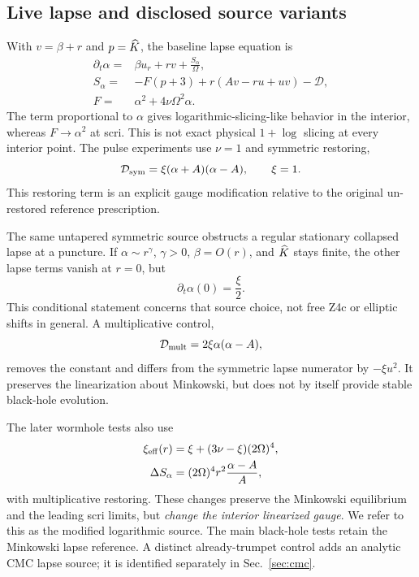 \subsection{Live lapse and disclosed source variants}
With $v=\beta+r$ and $p=\widehat K$, the baseline lapse equation is
\begin{align}
 \partial_t\alpha={}&\beta u_r+rv+\frac{S_\alpha}{\Omega},\nonumber\\
 S_\alpha={}&-F(p+3)+r(Av-ru+uv)-\mathcal D,\label{eq:lapse}\\
 F={}&\alpha^2+4\nu\Omega^2\alpha.\nonumber
\end{align}
The term proportional to $\alpha$ gives logarithmic-slicing-like behavior in the interior, whereas $F\to\alpha^2$ at scri. This is not exact physical $1+\log$ slicing at every interior point. The pulse experiments use $\nu=1$ and symmetric restoring,
\begin{equation}
 \mathcal D_{\rm sym}=\xi(\alpha+A)(\alpha-A),\qquad\xi=1.
\end{equation}
This restoring term is an explicit gauge modification relative to the original un-restored reference prescription.

The same untapered symmetric source obstructs a regular stationary collapsed lapse at a puncture. If $\alpha\sim r^\gamma$, $\gamma>0$, $\beta=O(r)$, and $\widehat K$ stays finite, the other lapse terms vanish at $r=0$, but
\begin{equation}
 \partial_t\alpha(0)=\frac{\xi}{2}.
\label{eq:obstruction}
\end{equation}
This conditional statement concerns that source choice, not free Z4c or elliptic shifts in general. A multiplicative control,
\begin{equation}
 \mathcal D_{\rm mult}=2\xi\alpha(\alpha-A),
\end{equation}
removes the constant and differs from the symmetric lapse numerator by $-\xi u^2$. It preserves the linearization about Minkowski, but does not by itself provide stable black-hole evolution.

The later wormhole tests also use
\begin{align}
 \xi_{\rm eff}(r)&=\xi+(3\nu-\xi)(2\Omega)^4,\nonumber\\
 \Delta S_\alpha&=(2\Omega)^4r^2\frac{\alpha-A}{A},
\label{eq:physical-log}
\end{align}
with multiplicative restoring. These changes preserve the Minkowski equilibrium and the leading scri limits, but \emph{change the interior linearized gauge}. We refer to this as the modified logarithmic source. The main black-hole tests retain the Minkowski lapse reference. A distinct already-trumpet control adds an analytic CMC lapse source; it is identified separately in Sec.~\ref{sec:cmc}.

